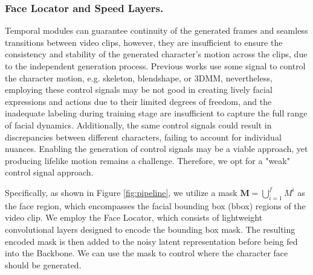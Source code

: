 \subsubsection{Face Locator and Speed Layers.} Temporal modules can guarantee continuity of the generated frames and seamless transitions between video clips, however, they are insufficient to ensure the consistency and stability of the generated character's motion across the clips, due to the independent generation process. Previous works use some signal to control the character motion, e.g. skeleton\cite{animate_anyone}, blendshape\cite{sadtalker}, or 3DMM\cite{sun2023vividtalk}, nevertheless, employing these control signals may be not good in creating lively facial expressions and actions due to their limited degrees of freedom, and the inadequate labeling during training stage are insufficient to capture the full range of facial dynamics. Additionally, the same control signals could result in discrepancies between different characters, failing to account for individual nuances. Enabling the generation of control signals may be a viable approach\cite{sun2023vividtalk}, yet producing lifelike motion remains a challenge. Therefore, we opt for a "weak" control signal approach. 

Specifically, as shown in Figure \ref{fig:pipeline}, we utilize a mask $\mathbf{M}=\bigcup_{i=1}^{f} M^{i}$ as the face region, which encompasses the facial bounding box (bbox) regions of the video clip. We employ the Face Locator, which consists of lightweight convolutional layers designed to encode the bounding box mask. The resulting encoded mask is then added to the noisy latent representation before being fed into the Backbone. We can use the mask to control where the character face should be generated. 


